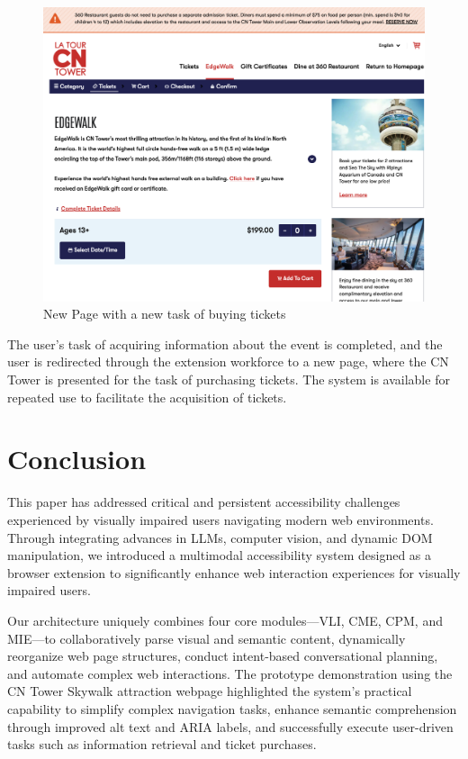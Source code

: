 \documentclass[conference]{IEEEtran}
\begin{document}
\begin{figure}[h]
\centerline{\includegraphics[width=\linewidth]{images/5.png}}
\caption{New Page with a new task of buying tickets}
\label{fig2}
\end{figure}

The user's task of acquiring information about the event is completed, and the user is redirected through the extension workforce to a new page, where the CN Tower is presented for the task of purchasing tickets. The system is available for repeated use to facilitate the acquisition of tickets.


\section{Conclusion}

This paper has addressed critical and persistent accessibility challenges experienced by visually impaired users navigating modern web environments. Through integrating advances in LLMs, computer vision, and dynamic DOM manipulation, we introduced a multimodal accessibility system designed as a browser extension to significantly enhance web interaction experiences for visually impaired users.

Our architecture uniquely combines four core modules—VLI, CME, CPM, and MIE—to collaboratively parse visual and semantic content, dynamically reorganize web page structures, conduct intent-based conversational planning, and automate complex web interactions. The prototype demonstration using the CN Tower Skywalk attraction webpage highlighted the system's practical capability to simplify complex navigation tasks, enhance semantic comprehension through improved alt text and ARIA labels, and successfully execute user-driven tasks such as information retrieval and ticket purchases.
\end{document}
